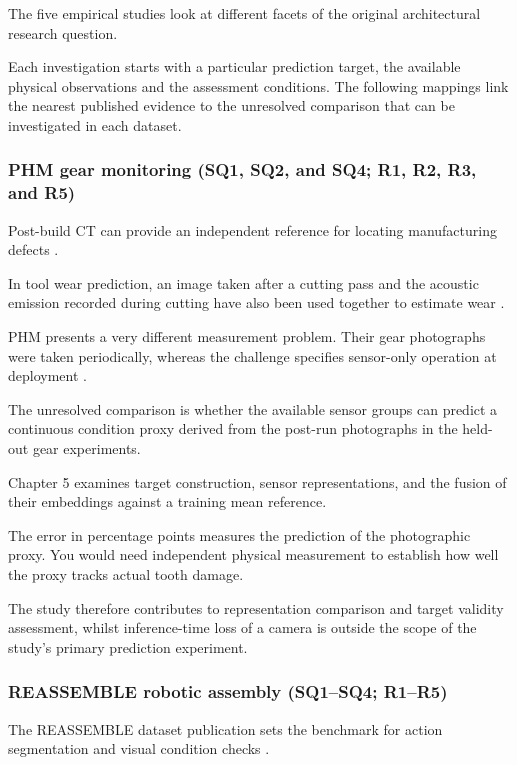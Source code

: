 The five empirical studies look at different facets of the original architectural research question.

Each investigation starts with a particular prediction target, the available physical observations
and the assessment conditions. The following mappings link the nearest published evidence to the
unresolved comparison that can be investigated in each dataset.

\subsubsection*{PHM gear monitoring (SQ1, SQ2, and SQ4; R1, R2, R3, and R5)}

Post-build CT can provide an independent reference for locating manufacturing defects
\parencite{Petrich2021Multimodal}.

In tool wear prediction, an image taken after a cutting pass and the acoustic emission recorded
during cutting have also been used together to estimate wear \parencite[PDF pp.~19--24]{P045}.

PHM presents a very different measurement problem. Their gear photographs were taken periodically,
whereas the challenge specifies sensor-only operation at deployment \parencite{PHM2026Challenge}.

The unresolved comparison is whether the available sensor groups can predict a continuous condition
proxy derived from the post-run photographs in the held-out gear experiments.

Chapter 5 examines target construction, sensor representations, and the fusion of their embeddings
against a training mean reference.

The error in percentage points measures the prediction of the photographic proxy. You would need
independent physical measurement to establish how well the proxy tracks actual tooth damage.

The study therefore contributes to representation comparison and target validity assessment, whilst
inference-time loss of a camera is outside the scope of the study's primary prediction experiment.

\subsubsection*{REASSEMBLE robotic assembly (SQ1--SQ4; R1--R5)}

The REASSEMBLE dataset publication sets the benchmark for action segmentation and visual condition
checks \parencite[PDF pp.~10--13]{Sliwowski2025REASSEMBLE}.

